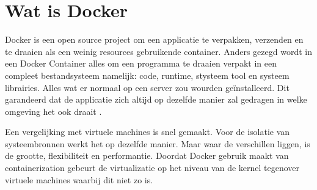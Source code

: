 \section{Wat is Docker}

Docker is een open source project om een applicatie te verpakken, verzenden en te draaien als een weinig resources gebruikende container. Anders gezegd wordt in een Docker Container alles om een programma te draaien verpakt in een compleet bestandsysteem namelijk: code, runtime, stysteem tool en systeem librairies. Alles wat er normaal op een server zou wourden geïnstalleerd. Dit garandeerd dat de applicatie zich altijd op dezelfde manier zal gedragen in welke omgeving het ook draait \cite{Docker2016d}.

Een vergelijking met virtuele machines is snel gemaakt. Voor de isolatie van systeembronnen werkt het op dezelfde manier. Maar waar de verschillen liggen, is de grootte, flexibiliteit en performantie. Doordat Docker gebruik maakt van containerization gebeurt de virtualizatie op het niveau van de kernel tegenover virtuele machines waarbij dit niet zo is. 

